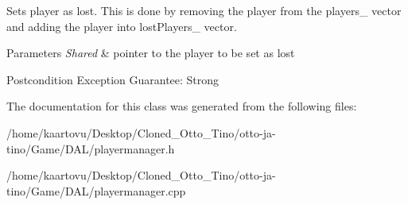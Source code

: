 Sets player as lost. This is done by removing the player from the players\-\_\- vector and adding the player into lost\-Players\-\_\- vector. 


\begin{DoxyParams}{Parameters}
{\em Shared} & pointer to the player to be set as lost \\
\hline
\end{DoxyParams}
\begin{DoxyPostcond}{Postcondition}
Exception Guarantee\-: Strong 
\end{DoxyPostcond}


The documentation for this class was generated from the following files\-:\begin{DoxyCompactItemize}
\item 
/home/kaartovu/\-Desktop/\-Cloned\-\_\-\-Otto\-\_\-\-Tino/otto-\/ja-\/tino/\-Game/\-D\-A\-L/playermanager.\-h\item 
/home/kaartovu/\-Desktop/\-Cloned\-\_\-\-Otto\-\_\-\-Tino/otto-\/ja-\/tino/\-Game/\-D\-A\-L/playermanager.\-cpp\end{DoxyCompactItemize}
